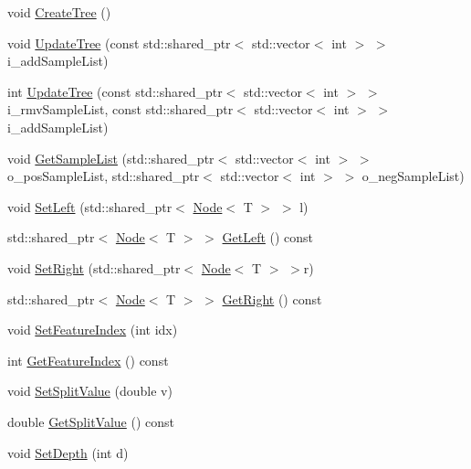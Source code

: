 \begin{DoxyCompactItemize}
\item 
void \hyperlink{class_random_forest_1_1_node_a838a0e84d4e3ea2d2e26e02b45021512}{Create\+Tree} ()
\item 
void \hyperlink{class_random_forest_1_1_node_aab9d283cdff74672e8051b1e613de4df}{Update\+Tree} (const std\+::shared\+\_\+ptr$<$ std\+::vector$<$ int $>$ $>$ i\+\_\+add\+Sample\+List)
\item 
int \hyperlink{class_random_forest_1_1_node_a9b8536d9708bb77d7a0bc69ce68336ba}{Update\+Tree} (const std\+::shared\+\_\+ptr$<$ std\+::vector$<$ int $>$ $>$ i\+\_\+rmv\+Sample\+List, const std\+::shared\+\_\+ptr$<$ std\+::vector$<$ int $>$ $>$ i\+\_\+add\+Sample\+List)
\item 
void \hyperlink{class_random_forest_1_1_node_a3f4736073de15bc3379585591fa7d84a}{Get\+Sample\+List} (std\+::shared\+\_\+ptr$<$ std\+::vector$<$ int $>$ $>$ o\+\_\+pos\+Sample\+List, std\+::shared\+\_\+ptr$<$ std\+::vector$<$ int $>$ $>$ o\+\_\+neg\+Sample\+List)
\item 
void \hyperlink{class_random_forest_1_1_node_a4666298bf8be2f0bcb775ecec5ba3aed}{Set\+Left} (std\+::shared\+\_\+ptr$<$ \hyperlink{class_random_forest_1_1_node}{Node}$<$ T $>$ $>$ l)
\item 
std\+::shared\+\_\+ptr$<$ \hyperlink{class_random_forest_1_1_node}{Node}$<$ T $>$ $>$ \hyperlink{class_random_forest_1_1_node_aa4b92a60a58285a05ef17828d67685bb}{Get\+Left} () const 
\item 
void \hyperlink{class_random_forest_1_1_node_a531a4604c9f0dd009342f99d54075781}{Set\+Right} (std\+::shared\+\_\+ptr$<$ \hyperlink{class_random_forest_1_1_node}{Node}$<$ T $>$ $>$r)
\item 
std\+::shared\+\_\+ptr$<$ \hyperlink{class_random_forest_1_1_node}{Node}$<$ T $>$ $>$ \hyperlink{class_random_forest_1_1_node_ae573b9d512ad8c91d0a6bfc196952579}{Get\+Right} () const 
\item 
void \hyperlink{class_random_forest_1_1_node_abf3bd7e9dd9a1c97d5ec9c8e041fd78c}{Set\+Feature\+Index} (int idx)
\item 
int \hyperlink{class_random_forest_1_1_node_a193a52330c2577fe3ac986a7d5b47f78}{Get\+Feature\+Index} () const 
\item 
void \hyperlink{class_random_forest_1_1_node_a647977bc484290719bf04159acf37328}{Set\+Split\+Value} (double v)
\item 
double \hyperlink{class_random_forest_1_1_node_ad6428488fffdfec3e69417937bfe786b}{Get\+Split\+Value} () const 
\item 
void \hyperlink{class_random_forest_1_1_node_a161f6e7ef5f1a017ea3927dc699dcffb}{Set\+Depth} (int d)

\end{DoxyCompactItemize}
